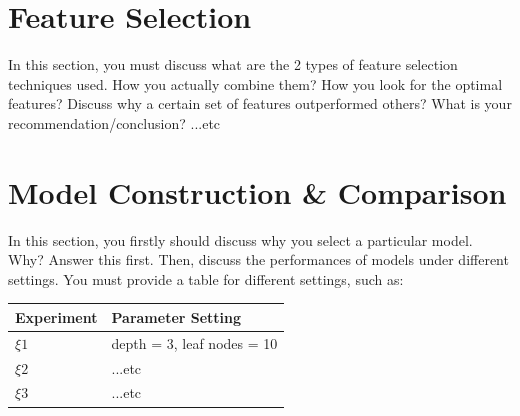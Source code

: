 \documentclass[12pt,a4paper,oneside]{article}
\begin{document}

\section{Feature Selection}

In this section, you must discuss what are the 2 types of feature selection techniques used. How you actually combine them? How you look for the optimal features? Discuss why a certain set of features outperformed others? What is your recommendation/conclusion? ...etc

\section{Model Construction \& Comparison}

In this section, you firstly should discuss why you select a particular model. Why? Answer this first. Then, discuss the performances of models under different settings. You must provide a table for different settings, such as:

\begin{table}[h]
\begin{tabular}{|l|l|}
\hline
Experiment & Parameter Setting          \\ \hline
$\xi1$         & depth = 3, leaf nodes = 10 \\ \hline
$\xi2$          & ...etc                     \\ \hline
$\xi3$         & ...etc                     \\ \hline
\end{tabular}
\end{table}
\end{document}
